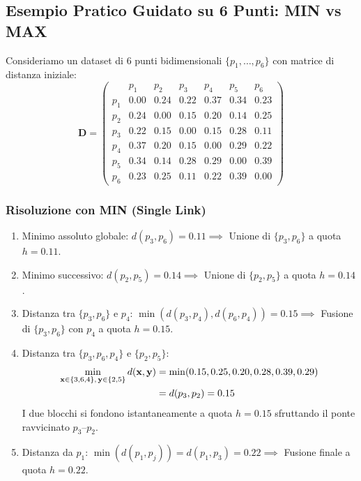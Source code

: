 \subsection{Esempio Pratico Guidato su 6 Punti: MIN vs MAX}

Consideriamo un dataset di 6 punti bidimensionali $\{p_1, \dots, p_6\}$ con matrice di distanza iniziale:
\begin{equation}
\mathbf{D} = 
\begin{pmatrix}
 & p_1 & p_2 & p_3 & p_4 & p_5 & p_6 \\
p_1 & 0.00 & 0.24 & 0.22 & 0.37 & 0.34 & 0.23 \\
p_2 & 0.24 & 0.00 & 0.15 & 0.20 & 0.14 & 0.25 \\
p_3 & 0.22 & 0.15 & 0.00 & 0.15 & 0.28 & 0.11 \\
p_4 & 0.37 & 0.20 & 0.15 & 0.00 & 0.29 & 0.22 \\
p_5 & 0.34 & 0.14 & 0.28 & 0.29 & 0.00 & 0.39 \\
p_6 & 0.23 & 0.25 & 0.11 & 0.22 & 0.39 & 0.00
\end{pmatrix}
\end{equation}

\subsubsection{Risoluzione con MIN (Single Link)}
\begin{enumerate}
    \item Minimo assoluto globale: $d(p_3, p_6) = 0.11 \implies$ Unione di $\{p_3, p_6\}$ a quota $h = 0.11$.
    \item Minimo successivo: $d(p_2, p_5) = 0.14 \implies$ Unione di $\{p_2, p_5\}$ a quota $h = 0.14$.
    \item Distanza tra $\{p_3, p_6\}$ e $p_4$: $\min(d(p_3, p_4), d(p_6, p_4)) = 0.15 \implies$ Fusione di $\{p_3, p_6\}$ con $p_4$ a quota $h = 0.15$.
    \item Distanza tra $\{p_3, p_6, p_4\}$ e $\{p_2, p_5\}$:
    \begin{align}
        \min_{\mathbf{x} \in \{3,6,4\}, \, \mathbf{y} \in \{2,5\}} d(\mathbf{x}, \mathbf{y}) &= \min(0.15, 0.25, 0.20, 0.28, 0.39, 0.29) \notag \\
        &= d(p_3, p_2) = 0.15
    \end{align}
    I due blocchi si fondono istantaneamente a quota $h = 0.15$ sfruttando il ponte ravvicinato $p_3$--$p_2$.
    \item Distanza da $p_1$: $\min(d(p_1, p_j)) = d(p_1, p_3) = 0.22 \implies$ Fusione finale a quota $h = 0.22$.
\end{enumerate}


